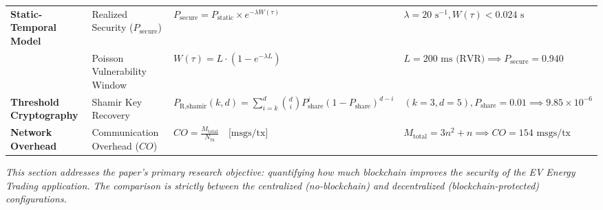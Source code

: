 \documentclass[10pt,twocolumn,journal]{IEEEtran}
\begin{document}
\begin{table}[htbp]
\begin{tabular}{@{}llll@{}}
\textbf{Static-Temporal Model} & Realized Security ($P_{\text{secure}}$) & $P_{\text{secure}} = P_{\text{static}} \times e^{-\lambda W(\tau)}$ & $\lambda = 20\text{ s}^{-1}, W(\tau) < 0.024\text{ s}$ \\
& Poisson Vulnerability Window & $W(\tau) = L \cdot \left(1 - e^{-\lambda L}\right)$ & $L = 200\text{ ms (RVR)} \implies P_{\text{secure}} = 0.940$ \\
\textbf{Threshold Cryptography} & Shamir Key Recovery & $P_{\text{R,shamir}}(k,d) = \sum_{i=k}^{d} \binom{d}{i} P_{\text{share}}^i (1 - P_{\text{share}})^{d-i}$ & $(k=3, d=5), P_{\text{share}}=0.01 \implies 9.85 \times 10^{-6}$ \\
\textbf{Network Overhead} & Communication Overhead ($CO$) & $CO = \frac{M_{\text{total}}}{N_{\text{tx}}} \quad \text{[msgs/tx]}$ & $M_{\text{total}} = 3n^2+n \implies CO = 154\text{ msgs/tx}$ \\
\bottomrule
\end{tabular}
\end{table}


\label{sec:part1}

\emph{This section addresses the paper's primary research objective: quantifying how much blockchain improves the security of the EV Energy Trading application. The comparison is strictly between the centralized (no-blockchain) and decentralized (blockchain-protected) configurations.}


\label{sec:vulnerability_no_bc}
\end{document}

